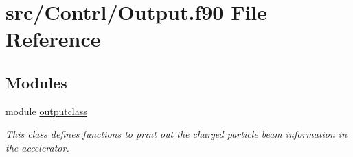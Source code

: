 \hypertarget{_output_8f90}{}\section{src/\+Contrl/\+Output.f90 File Reference}
\label{_output_8f90}
\subsection*{Modules}
\begin{DoxyCompactItemize}
\item 
module \mbox{\hyperlink{namespaceoutputclass}{outputclass}}
\begin{DoxyCompactList}\small\item\em This class defines functions to print out the charged particle beam information in the accelerator. \end{DoxyCompactList}\end{DoxyCompactItemize}
